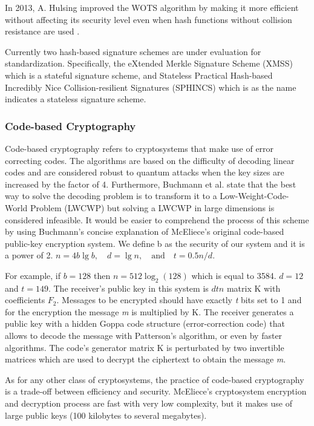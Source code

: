 \documentclass[conference, letterpaper]{IEEEtran}
\begin{document}
In 2013, A. Hulsing improved the WOTS algorithm by making it more efficient without affecting its security level even when hash functions without collision resistance are used \cite{Hulsing2013_W_OTS+}. 

Currently two hash-based signature schemes are under evaluation for standardization. Specifically, the eXtended Merkle Signature Scheme (XMSS) \cite{buchmann2011xmss} which is a stateful signature scheme, and Stateless Practical Hash-based Incredibly Nice Collision-resilient Signatures (SPHINCS) \cite{SPHINCS} which is as the name indicates a stateless signature scheme. 

\subsubsection{Code-based Cryptography}

Code-based cryptography refers to cryptosystems that make use of error correcting codes. The algorithms are based on the difficulty of decoding linear codes and are considered robust to quantum attacks when the key sizes are increased by the factor of 4. Furthermore, Buchmann et al. \cite{Buchmann2010} state that the best way to solve the decoding problem is to transform it to a Low-Weight-Code-World Problem (LWCWP) but solving a LWCWP in large dimensions is considered infeasible. It would be easier to comprehend the process of this scheme by using Buchmann's \cite{Buchmann2010} concise explanation of McEliece's original code-based public-key encryption system. We define b as the security of our system and it is a power of 2. $n = 4b \lg b,\quad d = \lg n,\quad\textrm{and}\quad t = 0.5n/d$.

For example, if $b=128$ then $n=512 \log_2 (128)$ which is equal to 3584. $d = 12$ and $t = 149$.
The receiver's public key in this system is $dtn$ matrix K with coefficients $F_2$. Messages to be encrypted should have exactly \textit{t} bits set to 1 and for the encryption the message \textit{m} is multiplied by K. The receiver generates a public key with a hidden Goppa code structure (error-correction code) that allows to decode the message with Patterson’s algorithm, or even by faster algorithms. The code’s generator matrix K is perturbated by two invertible matrices which are used to decrypt the ciphertext to obtain the message \textit{m}.

As for any other class of cryptosystems, the practice of code-based cryptography is a trade-off between efficiency and security. McEliece's cryptosystem encryption and decryption process are fast with very low complexity, but it makes use of large public keys (100 kilobytes to several megabytes).
\end{document}
